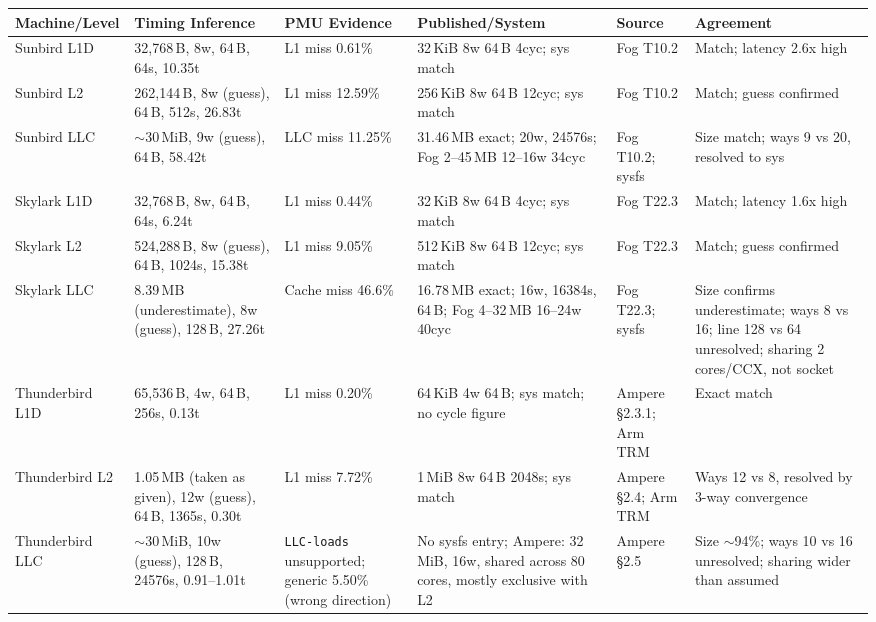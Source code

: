 \documentclass{article}
\begin{document}
\begin{table}[h]
\centering
\tiny
\begin{tabular}{@{}p{2.0cm}p{2.6cm}p{2.0cm}p{2.8cm}p{1.6cm}p{3.0cm}@{}}
\toprule
Machine/Level & Timing Inference & PMU Evidence & Published/System & Source & Agreement \\
\midrule
Sunbird L1D & 32,768\,B, 8w, 64\,B, 64s, 10.35t & L1 miss 0.61\% & 32\,KiB 8w 64\,B 4cyc; sys match & Fog T10.2 & Match; latency 2.6x high \\
Sunbird L2 & 262,144\,B, 8w (guess), 64\,B, 512s, 26.83t & L1 miss 12.59\% & 256\,KiB 8w 64\,B 12cyc; sys match & Fog T10.2 & Match; guess confirmed \\
Sunbird LLC & $\sim$30\,MiB, 9w (guess), 64\,B, 58.42t & LLC miss 11.25\% & 31.46\,MB exact; 20w, 24576s; Fog 2--45\,MB 12--16w 34cyc & Fog T10.2; sysfs & Size match; ways 9 vs 20, resolved to sys \\
\midrule
Skylark L1D & 32,768\,B, 8w, 64\,B, 64s, 6.24t & L1 miss 0.44\% & 32\,KiB 8w 64\,B 4cyc; sys match & Fog T22.3 & Match; latency 1.6x high \\
Skylark L2 & 524,288\,B, 8w (guess), 64\,B, 1024s, 15.38t & L1 miss 9.05\% & 512\,KiB 8w 64\,B 12cyc; sys match & Fog T22.3 & Match; guess confirmed \\
Skylark LLC & 8.39\,MB (underestimate), 8w (guess), 128\,B, 27.26t & Cache miss 46.6\% & 16.78\,MB exact; 16w, 16384s, 64\,B; Fog 4--32\,MB 16--24w 40cyc & Fog T22.3; sysfs & Size confirms underestimate; ways 8 vs 16; line 128 vs 64 unresolved; sharing 2 cores/CCX, not socket \\
\midrule
Thunderbird L1D & 65,536\,B, 4w, 64\,B, 256s, 0.13t & L1 miss 0.20\% & 64\,KiB 4w 64\,B; sys match; no cycle figure & Ampere \S2.3.1; Arm TRM & Exact match \\
Thunderbird L2 & 1.05\,MB (taken as given), 12w (guess), 64\,B, 1365s, 0.30t & L1 miss 7.72\% & 1\,MiB 8w 64\,B 2048s; sys match & Ampere \S2.4; Arm TRM & Ways 12 vs 8, resolved by 3-way convergence \\
Thunderbird LLC & $\sim$30\,MiB, 10w (guess), 128\,B, 24576s, 0.91--1.01t & \texttt{LLC-loads} unsupported; generic 5.50\% (wrong direction) & No sysfs entry; Ampere: 32\,MiB, 16w, shared across 80 cores, mostly exclusive with L2 & Ampere \S2.5 & Size $\sim$94\%; ways 10 vs 16 unresolved; sharing wider than assumed \\
\bottomrule
\end{tabular}
\end{table}
\end{document}
